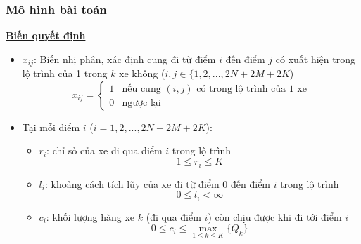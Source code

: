 \documentclass{beamer}
\begin{document}
	\begin{frame}
		\frametitle{Mô hình bài toán}
		\textbf{\underline{Biến quyết định}}
		\begin{itemize}
			\item $x_{ij}$: Biến nhị phân, xác định cung đi từ điểm $i$ đến điểm $j$ có xuất hiện trong lộ trình của 1 trong $k$ xe không ($i,j\in \{1,2,...,2N+2M+2K$)
			\begin{equation}
				x_{ij} = 
				\begin{cases}
					1 & \text{nếu cung $(i,j)$ có trong lộ trình của 1 xe}\\
					0 & \text{ngược lại}
				\end{cases}
			\end{equation}
			\item Tại mỗi điểm $i$ ($i=1,2,...,2N+2M+2K$):
			\begin{itemize}
				\item $r_i$: chỉ số của xe đi qua điểm $i$ trong lộ trình
				\begin{equation}
					1\leq r_i\leq K
				\end{equation}
				\item $l_i$: khoảng cách tích lũy của xe đi từ điểm $0$ đến điểm $i$ trong lộ trình
				\begin{equation}
					0\leq l_i < \infty
				\end{equation}
				\item $c_i$: khối lượng hàng xe $k$ (đi qua điểm $i$) còn chịu được khi đi tới điểm $i$
				\begin{equation}
					0\leq c_i\leq \max _{1\leq k\leq K} \{Q_k\}
				\end{equation}
			\end{itemize}
		\end{itemize}
	\end{frame}
\end{document}
